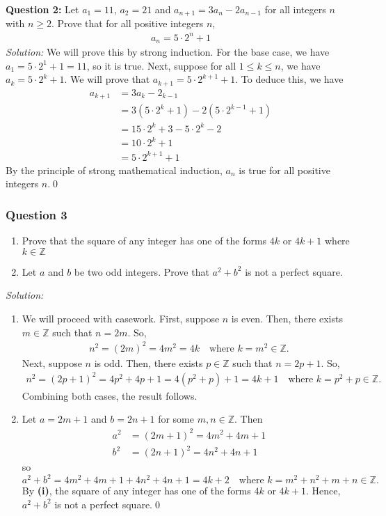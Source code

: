 \documentclass[12pt]{article}
\begin{document}
\textbf{Question 2:} Let $a_1=11$, $a_2=21$ and $a_{n+1}=3a_n-2a_{n-1}$ for all integers $n$ with $n\geq 2$. Prove that for all positive integers $n$,
\begin{align*}
    a_n=5\cdot 2^n+1
\end{align*}
\emph{Solution:} We will prove this by strong induction.
\newline
\newline For the base case, we have $a_1=5\cdot 2^1+1=11$, so it is true. Next, suppose for all $1\le k \le n$, we have $a_k=5\cdot 2^k+1$. We will prove that $a_{k+1}=5\cdot 2^{k+1}+1$. To deduce this, we have
\begin{align*}
    a_{k+1}&=3a_k-2_{k-1}\\
    &=3(5\cdot 2^k+1)-2(5\cdot 2^{k-1}+1)\\
    &=15\cdot 2^k+3-5\cdot 2^k-2\\
    &=10\cdot 2^k+1\\
    &=5\cdot 2^{k+1}+1
\end{align*}
By the principle of strong mathematical induction, $a_n$ is true for all positive integers $n$.\qed
\subsubsection*{Question 3}
\begin{enumerate}[label=\textbf{(\roman*)}]
\itemsep 0em
    \item Prove that the square of any integer has one of the forms $4k$ or $4k+1$ where $k\in\mathbb{Z}$
    \item Let $a$ and $b$ be two odd integers. Prove that $a^2+b^2$ is not a perfect square.
\end{enumerate}
\emph{Solution:}
\begin{enumerate}[label=\textbf{(\roman*)}]
\itemsep 0em
    \item We will proceed with casework. 
    \newline
    \newline First, suppose $n$ is even. Then, there exists $m\in\mathbb{Z}$ such that $n=2m$. So, 
    \begin{align*}
        n^2=(2m)^2=4m^2=4k\quad\text{where } k=m^2\in\mathbb{Z}.
    \end{align*}
    Next, suppose $n$ is odd. Then, there exists $p\in\mathbb{Z}$ such that $n=2p+1$. So,
    \begin{align*}
        n^2=(2p+1)^2=4p^2+4p+1=4(p^2+p)+1=4k+1\quad\text{where } k=p^2+p\in\mathbb{Z}.
    \end{align*}
    Combining both cases, the result follows.
    \item Let $a=2m+1$ and $b=2n+1$ for some $m,n\in\mathbb{Z}$. Then
    \begin{align*}
        a^2&=(2m+1)^2=4m^2+4m+1\\
        b^2&=(2n+1)^2=4n^2+4n+1
    \end{align*}
    so \[a^2+b^2=4m^2+4m+1+4n^2+4n+1=4k+2\quad \text{where } k=m^2+n^2+m+n\in\mathbb{Z}.\]
    By \textbf{(i)}, the square of any integer has one of the forms $4k$ or $4k+1$. Hence, $a^2+b^2$ is not a perfect square.\qed
\end{enumerate}
\end{document}
